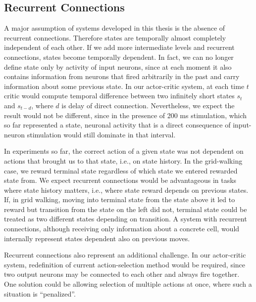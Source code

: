 \documentclass[a4paper,12pt,openright]{book}
\begin{document}
\subsection{Recurrent Connections}
A major assumption of systems developed in this thesis is the absence of recurrent connections. Therefore states are temporally almost completely independent of each other. If we add more intermediate levels and recurrent connections, states become temporally dependent. In fact, we can no longer define state only by activity of input neurons, since at each moment it also contains information from neurons that fired arbitrarily in the past and carry information about some previous state. In our actor-critic system, at each time $t$ critic would compute temporal difference between two infinitely short states $s_t$ and $s_{t-d}$, where $d$ is delay of direct connection. Nevertheless, we expect the result would not be different, since in the presence of 200 ms stimulation, which so far represented a state, neuronal activity that is a direct consequence of input-neuron stimulation would still dominate in that interval.

In experiments so far, the correct action of a given state was not dependent on actions that brought us to that state, i.e., on state history. In the grid-walking case, we reward terminal state regardless of which state we entered rewarded state from. We expect recurrent connections would be advantageous in tasks where state history matters, i.e., where state reward depends on previous states. If, in grid walking, moving into terminal state from the state above it led to reward but transition from the state on the left did not, terminal state could be treated as two different states depending on transition. A system with recurrent connections, although receiving only information about a concrete cell, would internally represent states dependent also on previous moves.

Recurrent connections also represent an additional challenge. In our actor-critic system, redefinition of current action-selection method would be required, since two output neurons may be connected to each other and always fire together. One solution could be allowing selection of multiple actions at once, where such a situation is ``penalized''.


\iffalse
\end{document}
